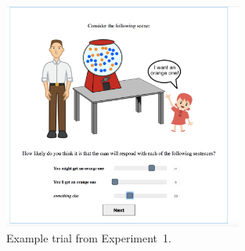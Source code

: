 \documentclass[man, floatsintext]{apa6}
\begin{document}
\begin{figure}[th!]
\center
\includegraphics[width=0.7\textwidth, trim={0 0 1.1cm 0},clip]{plots/pre-test-example-trial.png} 
\caption{Example trial from Experiment~1. \label{fig:norming-trial} }
\end{figure}
\end{document}
